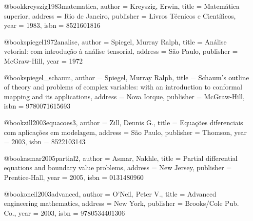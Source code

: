 @book{kreyszig1983matematica,
  author = {Kreyszig, Erwin},
  title = {Matemática superior},
  address = {Rio de Janeiro},
  publisher = {Livros Técnicos e Científicos},
  year = {1983}, %
  isbn = {8521601816}%
}

@book{spiegel1972analise,
  author = {Spiegel, Murray Ralph},
  title = {Análise vetorial: com introdução à análise tensorial},
  address = {São Paulo},
  publisher = {McGraw-Hill},
  year = {1972}
}

@book{spiegel_schaum,
  author = {Spiegel, Murray Ralph},
  title = {Schaum's outline of theory and problems of complex variables: with an introduction to conformal mapping and its applications},
  address = {Nova Iorque},
  publisher = {McGraw-Hill},
  isbn = {9780071615693}
}

@book{zill2003equacoes3,
  author = {Zill, Dennis G.},
  title = {Equações diferenciais com aplicações em modelagem},
  address = {São Paulo},
  publisher = {Thomson},
  year = {2003},
  isbn = {8522103143}%
}

@book{asmar2005partial2,
  author = {Asmar, Nakhle},
  title = {Partial differential equations and boundary value problems},
  address = {New Jersey},
  publisher = {Prentice-Hall},
  year = {2005},
  isbn = {0131480960}
}

@book{oneil2003advanced,
  author = {O'Neil, Peter V.},
  title = {Advanced engineering mathematics},
  address = {New York},
  publisher = {Brooks/Cole Pub. Co.},
  year = {2003},
  isbn = {9780534401306}
}

